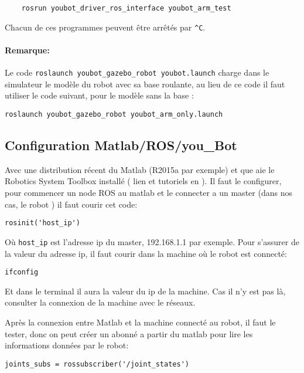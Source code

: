 \begin{verbatim}
	rosrun youbot_driver_ros_interface youbot_arm_test
\end{verbatim} 
		
Chacun de ces programmes peuvent être arrêtés par \verb|^C|.


\paragraph{Remarque:} Le code \verb|roslaunch youbot_gazebo_robot youbot.launch| charge dans le simulateur le modèle du robot avec sa base roulante, au lieu de ce code il faut utiliser le code suivant, pour le modèle sans la base :

\begin{verbatim}	
roslaunch youbot_gazebo_robot youbot_arm_only.launch
\end{verbatim}

\subsection{Configuration Matlab/ROS/you\_Bot}
Avec une distribution récent du Matlab (R2015a par exemple) et que aie le \flqq{}Robotics System Toolbox\frqq{} installé ( lien et tutoriels en \cite{matlabrobotics} ). Il faut le configurer, pour commencer un node ROS au matlab et le connecter a un master (dans nos cas, le robot ) il faut courir cet code:
\begin{verbatim}
rosinit('host_ip')
\end{verbatim}

Où \verb|host_ip| est l'adresse ip du master, 192.168.1.1 par exemple. Pour s'assurer de la valeur du adresse ip, il faut courir dans la machine où le robot est connecté:

\begin{verbatim}
ifconfig
\end{verbatim}

Et dans le terminal il aura la valeur du ip de la machine. Cas il n'y est pas là, consulter la connexion de la machine avec le réseaux.

Après la connexion entre Matlab et la machine connecté au robot, il faut le tester, donc on peut créer un abonné a partir du matlab pour lire les informations données par le robot:


\begin{verbatim}
joints_subs = rossubscriber('/joint_states')
\end{verbatim} 

